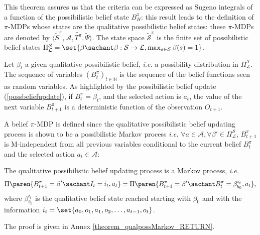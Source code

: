 This theorem assures us that the criteria
can be expressed as Sugeno integrals 
of a function of the possibilistic belief state $B^{\pi}_H$: 
this result leads to the definition of $\pi$-MDPs whose states are the qualitative possibilistic belief states:
these $\pi$-MDPs are denoted by $\langle \tilde{S}^{\pi}, \mathcal{A}, \tilde{T^{\pi}}, \tilde{\Psi} \rangle$.
The state space $\tilde{ \mathcal{S}}^{\pi} $ 
is the finite set of possibilistic belief states
$\Pi^{\mathcal{S}}_{\mathcal{L}} = \set{ \beta \sachant \beta: \mathcal{S} \rightarrow \mathcal{L}, \max_{s \in \mathcal{S}} \beta(s) = 1 }$.

Let $\beta_t$ a given qualitative possibilistic belief, 
\textit{i.e.} a possibility distribution in $\Pi^{\mathcal{S}}_{\mathcal{L}}$.
The sequence of variables $(B_t^{\pi})_{t \in \mathbb{N}}$ is the sequence of the belief functions seen as random variables.
As highlighted by the possibilistic belief update (\ref{possbeliefupdate}),
if $B^{\pi}_t=\beta_t$, and the selected action is $a_t$,
the value of the next variable $B^{\pi}_{t+1}$ 
is a deterministic function of the observation $O_{t+1}$. 

A belief $\pi$-MDP is defined since 
the qualitative possibilistic belief updating process is shown to be a possibilistic Markov process \textit{i.e.}
$\forall a \in \mathcal{A}, \forall \beta' \in \Pi^{\mathcal{S}}_{\mathcal{L}}$,
$B^{\pi}_{t+1}$ is M-independent from all previous variables conditional to the current belief $B^{\pi}_{t}$ and the selected action $a_t \in \mathcal{A}$:
\begin{theorem}
\label{theorem_qualpossMarkov}
The qualitative possibilistic belief updating process is a Markov process, \textit{i.e.}
\begin{equation}
\label{possibilistic_belief_markov}
\Pi \paren{ B^{\pi}_{t+1} = \beta' \sachant I_t=i_t, a_t } = \Pi \paren{ B^{\pi}_{t+1} = \beta' \sachant B^{\pi}_t=\beta_{b_0}^{i_t}, a_t },
\end{equation}
where $\beta_{b_0}^{i_t}$ is the qualitative belief state reached starting with $\beta_0$ and with the information $i_t = \set{ a_0,o_1,a_1,o_2, \ldots, a_{t-1},o_t }$.
\end{theorem}
The proof is given in Annex \ref{theorem_qualpossMarkov_RETURN}.

